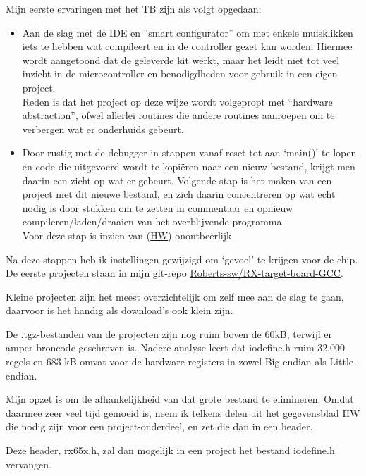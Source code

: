 \documentclass[a4paper, 11pt, fleqn, twoside]{scrartcl}%
\begin{document}
Mijn eerste ervaringen met het TB zijn als volgt opgedaan:
\begin{itemize}
\item Aan de slag met de IDE en ``smart configurator'' om met enkele
 muisklikken iets te hebben wat compileert en in de controller gezet
 kan worden. Hiermee wordt aangetoond dat de geleverde kit werkt, maar
 het leidt niet tot veel inzicht in de microcontroller en benodigdheden
 voor gebruik in een eigen project.\\
 Reden is dat het project op deze wijze wordt volgepropt met ``hardware
 abstraction'', ofwel allerlei routines die andere routines aanroepen
 om te verbergen wat er onderhuids gebeurt.
\item Door rustig met de debugger in stappen vanaf reset tot aan `main()'
 te lopen en code die uitgevoerd wordt te kopi\"eren naar een nieuw bestand,
 krijgt men daarin een zicht op wat er gebeurt. Volgende stap is het maken
 van een project met dit nieuwe bestand, en zich daarin concentreren
 op wat echt nodig is door stukken om te zetten in commentaar en opnieuw
 compileren/laden/draaien van het overblijvende programma.\\
 Voor deze stap is inzien van (\href{https://www.renesas.com/eu/en/doc/products/mpumcu/doc/rx_family/001/r01uh0590ej0230-rx651.pdf}{HW})
 onontbeerlijk.\\
\end{itemize}

Na deze stappen heb ik instellingen gewijzigd om `gevoel' te krijgen voor
 de chip. De eerste projecten staan in mijn git-repo 
\href{https://github.com/Roberts-sw/RX-target-board-GCC}{Roberts-sw/RX-target-board-GCC}.

Kleine projecten zijn het meest overzichtelijk om zelf mee aan de slag te 
gaan, daarvoor is het handig als download's ook klein zijn.

De .tgz-bestanden van de projecten zijn nog ruim boven de 60kB, terwijl er 
 amper broncode geschreven is.
 Nadere analyse leert dat iodefine.h ruim 32.000 regels en 683 kB omvat
 voor de hardware-registers in zowel Big-endian als Little-endian.

Mijn opzet is om de afhankelijkheid van dat grote bestand te elimineren. 
Omdat daarmee zeer veel tijd gemoeid is, neem ik telkens delen uit het 
gegevensblad HW die nodig zijn voor een project-onderdeel, en zet die dan 
in een header.

Deze header, rx65x.h, zal dan mogelijk in een project het bestand iodefine.h 
vervangen.
\clearpage
\end{document}
